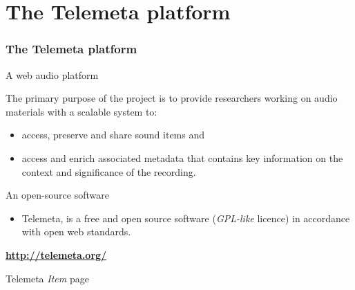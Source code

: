 \documentclass[final, hyperref, table]{beamer}
\begin{document}
\section[Telemeta]{The Telemeta platform}\label{sec:Telemeta}
\begin{frame}
  \frametitle{The Telemeta platform}
  \begin{block}{A web audio platform}
    
    The primary purpose of the project is to provide researchers
      working on audio materials with a scalable system to:
      \begin{itemize}
      \item access, preserve and share \alert{sound items} and
      \item access and enrich \alert{associated metadata} that
        contains key information on the context and significance of
        the recording.
      \end{itemize}
   
    
  \end{block}
  \begin{block}{An open-source software}
    \begin{itemize}
    \item Telemeta, is a \alert{free and open source software} (\emph{GPL-like} licence)
       in accordance with \alert{open web standards}.
    \end{itemize}
    \vspace{-0.5cm}
    \begin{center}
\hspace{1cm}
      \colorbox{yellow!40}{\textbf{\url{http://telemeta.org/}}}
    \end{center}
  \end{block}
\end{frame}

\begin{frame}[plain]{Telemeta \emph{Item} page}
  \begin{center}
  \end{center}

\end{frame}
\end{document}
